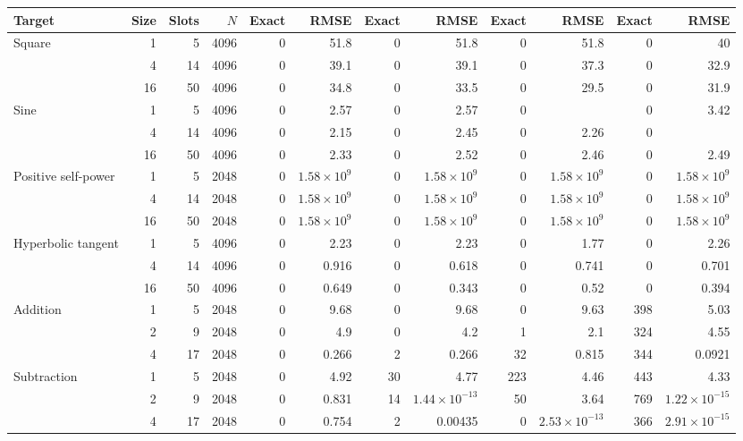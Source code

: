 \begin{table}[htbp]
\begin{tabular*}{\linewidth}{@{\extracolsep{\fill}}lrrr *{4}{rr}@{}}
\cmidrule(lr){5-6}\cmidrule(lr){7-8}\cmidrule(lr){9-10}\cmidrule(l){11-12}
Target & Size & Slots & $N$ & Exact & RMSE & Exact & RMSE & Exact & RMSE & Exact & RMSE \\
\midrule
Square & 1 & 5 & 4096 & 0 & 51.8 & 0 & 51.8 & 0 & 51.8 & 0 & 40 \\
 & 4 & 14 & 4096 & 0 & 39.1 & 0 & 39.1 & 0 & 37.3 & 0 & 32.9 \\
 & 16 & 50 & 4096 & 0 & 34.8 & 0 & 33.5 & 0 & 29.5 & 0 & 31.9 \\
\addlinespace[0.7pt]
Sine & 1 & 5 & 4096 & 0 & 2.57 & 0 & 2.57 & 0 & {\bfseries\boldmath 2.18} & 0 & 3.42 \\
 & 4 & 14 & 4096 & 0 & 2.15 & 0 & 2.45 & 0 & 2.26 & 0 & {\bfseries\boldmath 2.08} \\
 & 16 & 50 & 4096 & 0 & 2.33 & 0 & 2.52 & 0 & 2.46 & 0 & 2.49 \\
\addlinespace[0.7pt]
Positive self-power & 1 & 5 & 2048 & 0 & $1.58\!\times\!10^{9}$ & 0 & $1.58\!\times\!10^{9}$ & 0 & $1.58\!\times\!10^{9}$ & 0 & $1.58\!\times\!10^{9}$ \\
 & 4 & 14 & 2048 & 0 & $1.58\!\times\!10^{9}$ & 0 & $1.58\!\times\!10^{9}$ & 0 & $1.58\!\times\!10^{9}$ & 0 & $1.58\!\times\!10^{9}$ \\
 & 16 & 50 & 2048 & 0 & $1.58\!\times\!10^{9}$ & 0 & $1.58\!\times\!10^{9}$ & 0 & $1.58\!\times\!10^{9}$ & 0 & $1.58\!\times\!10^{9}$ \\
\addlinespace[0.7pt]
Hyperbolic tangent & 1 & 5 & 4096 & 0 & 2.23 & 0 & 2.23 & 0 & 1.77 & 0 & 2.26 \\
 & 4 & 14 & 4096 & 0 & 0.916 & 0 & 0.618 & 0 & 0.741 & 0 & 0.701 \\
 & 16 & 50 & 4096 & 0 & 0.649 & 0 & 0.343 & 0 & 0.52 & 0 & 0.394 \\
\addlinespace[0.7pt]
Addition & 1 & 5 & 2048 & 0 & 9.68 & 0 & 9.68 & 0 & 9.63 & 398 & 5.03 \\
 & 2 & 9 & 2048 & 0 & 4.9 & 0 & 4.2 & 1 & 2.1 & 324 & 4.55 \\
 & 4 & 17 & 2048 & 0 & 0.266 & 2 & 0.266 & 32 & 0.815 & 344 & 0.0921 \\
\addlinespace[0.7pt]
Subtraction & 1 & 5 & 2048 & 0 & 4.92 & 30 & 4.77 & 223 & 4.46 & 443 & 4.33 \\
 & 2 & 9 & 2048 & 0 & 0.831 & 14 & $1.44\!\times\!10^{-13}$ & 50 & 3.64 & 769 & $1.22\!\times\!10^{-15}$ \\
 & 4 & 17 & 2048 & 0 & 0.754 & 2 & 0.00435 & 0 & $2.53\!\times\!10^{-13}$ & 366 & $2.91\!\times\!10^{-15}$ \\

\end{tabular*}
\end{table}
